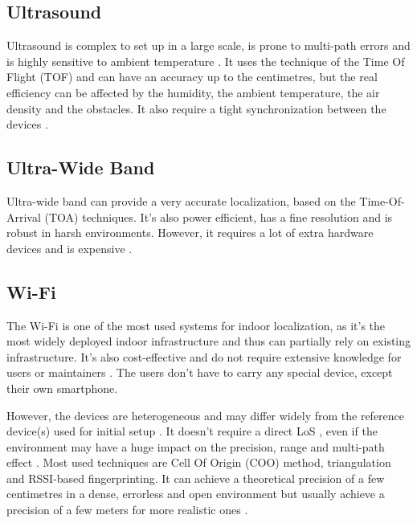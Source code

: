 \subsection{Ultrasound}

Ultrasound is complex to set up in a large scale, is prone to multi-path errors and is highly sensitive to ambient temperature \cite{mainetti_survey_2014}. It uses the technique of the Time Of Flight (TOF) and can have an accuracy up to the centimetres, but the real efficiency can be affected by the humidity, the ambient temperature, the air density and the obstacles. It also require a tight synchronization between the devices \cite{shang_overview_2022} \cite{mainetti_survey_2014}.

\subsection{Ultra-Wide Band}

Ultra-wide band can provide a very accurate localization, based on the Time-Of-Arrival (TOA) techniques. It's also power efficient, has a fine resolution and is robust in harsh environments. However, it requires a lot of extra hardware devices \cite{spachos_ble_2020} and is expensive \cite{shang_overview_2022}.

\subsection{Wi-Fi}

The Wi-Fi is one of the most used systems for indoor localization, as it's the most widely deployed indoor infrastructure and thus can partially rely on existing infrastructure. It's also cost-effective \cite{mainetti_survey_2014} and do not require extensive knowledge for users or maintainers \cite{shang_overview_2022}. The users don't have to carry any special device, except their own smartphone.

However, the devices are heterogeneous and may differ widely from the reference device(s) used for initial setup \cite{liu_survey_2020}. It doesn't require a direct LoS \cite{mainetti_survey_2014}, even if the environment may have a huge impact on the precision, range and multi-path effect \cite{liu_survey_2020}. Most used techniques are Cell Of Origin (COO) method, triangulation and RSSI-based fingerprinting. It can achieve a theoretical precision of a few centimetres in a dense, errorless and open environment but usually achieve a precision of a few meters for more realistic ones \cite{liu_survey_2020}.

